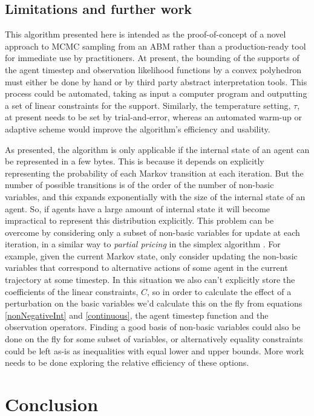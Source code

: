 \documentclass{article}
\begin{document}
\subsection{Limitations and further work}
This algorithm presented here is intended as the proof-of-concept of a novel approach to MCMC sampling from an ABM rather than a production-ready tool for immediate use by practitioners. At present, the bounding of the supports of the agent timestep and observation likelihood functions by a convex polyhedron must either be done by hand or by third party abstract interpretation tools. This process could be automated, taking as input a computer program and outputting a set of linear constraints for the support. Similarly, the temperature setting, $\tau$, at present needs to be set by trial-and-error, whereas an automated warm-up or adaptive scheme would improve the algorithm's efficiency and usability.

As presented, the algorithm is only applicable if the internal state of an agent can be represented in a few bytes. This is because it depends on explicitly representing the probability of each Markov transition at each iteration. But the number of possible transitions is of the order of the number of non-basic variables, and this expands exponentially with the size of the internal state of an agent. So, if agents have a large amount of internal state it will become impractical to represent this distribution explicitly. This problem can be overcome by considering only a subset of non-basic variables for update at each iteration, in a similar way to \textit{partial pricing} in the simplex algorithm \citep{maros2002computational}. For example, given the current Markov state, only consider updating the non-basic variables that correspond to alternative actions of some agent in the current trajectory at some timestep. In this situation we also can't explicitly store the coefficients of the linear constraints, $C$, so in order to calculate the effect of a perturbation on the basic variables we'd calculate this on the fly from equations \eqref{nonNegativeInt} and \eqref{continuous}, the agent timestep function and the observation operators. Finding a good basis of non-basic variables could also be done on the fly for some subset of variables, or alternatively equality constraints could be left as-is as inequalities with equal lower and upper bounds. More work needs to be done exploring the relative efficiency of these options.

\section{Conclusion}
\end{document}
